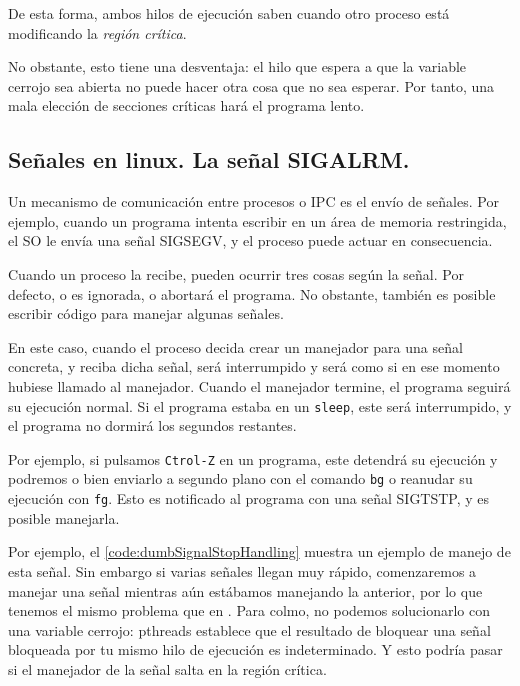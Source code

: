 De esta forma, ambos hilos de ejecución saben cuando otro proceso está modificando la \emph{región crítica}.

No obstante, esto tiene una desventaja: el hilo que espera a que la variable cerrojo sea abierta no puede hacer otra 
cosa que no sea esperar. Por tanto, una mala elección de secciones críticas hará el programa lento.

\subsection{Señales en linux. La señal SIGALRM.}
Un mecanismo de comunicación entre procesos o \gls{IPC} es el envío de señales. Por ejemplo, cuando un programa intenta 
escribir en un área de memoria restringida, el \gls{SO} le envía una señal \gls{SIGSEGV}, y el proceso puede actuar en 
consecuencia.

Cuando un proceso la recibe, pueden ocurrir tres cosas según la señal. Por defecto, o es ignorada, o abortará el 
programa. No obstante, también es posible escribir código para manejar algunas señales.

En este caso, cuando el proceso decida crear un manejador para una señal concreta, y 
reciba dicha señal, será interrumpido y será como si en ese momento hubiese llamado al manejador. Cuando el manejador 
termine, el programa seguirá su ejecución normal. Si el programa estaba en un \texttt{sleep}, este será interrumpido, y 
el programa no dormirá los segundos restantes.

Por ejemplo, si pulsamos \texttt{Ctrol-Z} en un programa, este detendrá su ejecución y podremos o bien enviarlo a 
segundo plano con el comando \texttt{bg} o reanudar su ejecución con \texttt{fg}. Esto es notificado al programa con 
una señal \gls{SIGTSTP}, y es posible manejarla.

Por ejemplo, el \lstlistingname{} \ref{code:dumbSignalStopHandling} muestra un ejemplo de manejo de esta señal. Sin 
embargo si varias señales llegan muy rápido, comenzaremos a manejar una señal mientras aún estábamos manejando la 
anterior, por lo que tenemos el mismo problema que en . Para colmo, no podemos solucionarlo 
con una variable cerrojo: \gls{pthreads} establece que el resultado de bloquear una señal 
bloqueada por tu mismo hilo de ejecución es indeterminado. Y esto podría pasar si el manejador de la señal salta en la 
región crítica.

